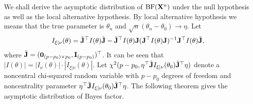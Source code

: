 \documentclass[11pt]{article}
\theoremstyle{plain}
\theoremstyle{definition}
\theoremstyle{remark}
\begin{document}
We shall derive the asymptotic distribution of $\text{BF}(\mathbf{X}^n)$ under the null hypothesis as well as the local alternative hypothesis.
By local alternative hypothesis we means that the true parameter is $\theta_n$ and $\sqrt{n}(\theta_n-\theta_0)\to \eta$.
Let
\begin{align*}
    I_{\xi|\nu}(\theta) = 
    \tilde {\mathbf{J}} ^\top  I(\theta) \tilde {\mathbf{J}}
    -
    \tilde {\mathbf{J}} ^\top  I(\theta) \mathbf{J}
    (  \mathbf{J} ^\top  I(\theta) \mathbf{J} )^{-1}
    \mathbf{J} ^\top  I(\theta) \tilde {\mathbf{J}}
    ,
\end{align*}
where
$\tilde{\mathbf{J}}=(\mathbf {0}_{ (p- p_0) \times p_0 },\mathbf{I}_{(p-p_0)})^\top $.
It can be seen that $|I(\theta)| = |I_{\nu}(\theta)|\cdot |I_{\xi | \nu}(\theta )|$.
Let $\chi^2(p-p_0,\eta^\top\tilde {\mathbf{J}} I_{\xi|\nu}(\theta_0) \tilde{\mathbf{J}}^\top\eta )$ denote a noncentral chi-squared random variable with $p-p_0$ degrees of freedom and noncentrality parameter $\eta^\top\tilde {\mathbf{J}} I_{\xi|\nu}(\theta_0) \tilde{\mathbf{J}}^\top\eta$.
The following theorem gives the asymptotic distribution of Bayes factor.
\end{document}
